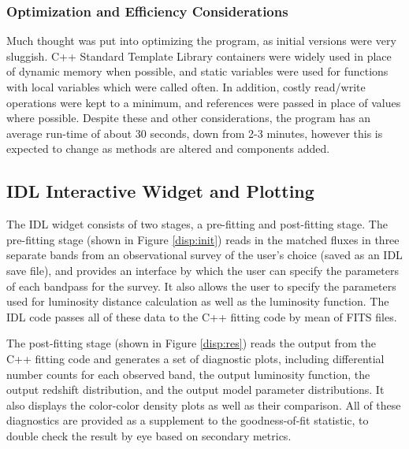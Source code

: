 \documentclass[twocolumn,letterpaper,10pt]{article}
\begin{document}
\subsubsection{Optimization and Efficiency Considerations}

Much thought was put into optimizing the program, as initial versions were very sluggish. C++ Standard Template Library containers were widely used in place of dynamic memory when possible, and static variables were used for functions with local variables which were called often. In addition, costly read/write operations were kept to a minimum, and references were passed in place of values where possible. Despite these and other considerations, the program has an average run-time of about 30 seconds, down from 2-3 minutes, however this is expected to change as methods are altered and components added.

\subsection{IDL Interactive Widget and Plotting}

The IDL widget consists of two stages, a pre-fitting and post-fitting stage. The pre-fitting stage (shown in Figure \ref{disp:init}) reads in the matched fluxes in three separate bands from an observational survey of the user's choice (saved as an IDL save file), and provides an interface by which the user can specify the parameters of each bandpass for the survey. It also allows the user to specify the parameters used for luminosity distance calculation as well as the luminosity function. The IDL code passes all of these data to the C++ fitting code by mean of FITS files.

The post-fitting stage (shown in Figure \ref{disp:res}) reads the output from the C++ fitting code and generates a set of diagnostic plots, including differential number counts for each observed band, the output luminosity function, the output redshift distribution, and the output model parameter distributions. It also displays the color-color density plots as well as their comparison. All of these diagnostics are provided as a supplement to the goodness-of-fit statistic, to double check the result by eye based on secondary metrics.
\end{document}
